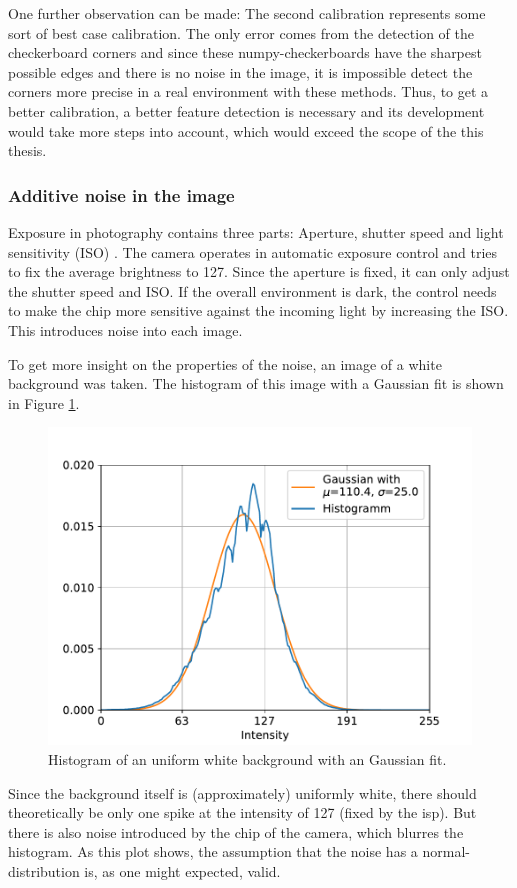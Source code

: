 One further observation can be made: The second calibration represents some sort of best case calibration.
The only error comes from the detection of the checkerboard corners and since these numpy-checkerboards have the sharpest possible edges and there is no noise in the image, it is impossible detect the corners more precise in a real environment with these methods.
Thus, to get a better calibration, a better feature detection is necessary and its development would take more steps into account, which would exceed the scope of the this thesis.

\subsubsection{Additive noise in the image} 
Exposure in photography contains three parts: Aperture, shutter speed and light sensitivity (ISO) \cite{exposure}.
The camera operates in automatic exposure control and tries to fix the average brightness to 127.
Since the aperture is fixed, it can only adjust the shutter speed and ISO.
If the overall environment is dark, the control needs to make the chip more sensitive against the incoming light by increasing the ISO.
This introduces noise into each image.

To get more insight on the properties of the noise, an image of a white background was taken.
The histogram of this image with a Gaussian fit is shown in Figure \ref{development:noise_dist}.
\begin{figure}[ht]
	\centering
	\includegraphics[width=0.9\linewidth]{3-development/calibration/images/noise_distribution.pdf}
	\caption{Histogram of an uniform white background with an Gaussian fit.\label{development:noise_dist}}
\end{figure}
Since the background itself is (approximately) uniformly white, there should theoretically be only one spike at the intensity of 127 (fixed by the \acs{isp}).
But there is also noise introduced by the chip of the camera, which blurres the histogram.
As this plot shows, the assumption that the noise has a normal-distribution is, as one might expected, valid.


